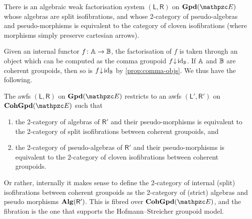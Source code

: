 \documentclass[a4paper,11pt]{amsart}
\newcommand{\cmmcatincat}[2]{#1 \downarrow #2}
\begin{document}
There is an algebraic weak factorisation system $(\mathsf{L},\mathsf{R})$ on $\Egpdin$ whose algebras are split isofibrations, and whose 2-category of pseudo-algebras and pseudo-morphisms is equivalent to the category of cloven isofibrations (where morphisms simply preserve cartesian arrows).

Given an internal functor $f\colon \mathbb{A} \to \mathbb{B}$, the factorisation of $f$ is taken through an object which can be computed as the comma groupoid $\cmmcatincat{f\hspace{-.5ex}}{\hspace{-.3ex}\idcat{\Bgpdf}}$.
If $\mathbb{A}$ and $\mathbb{B}$ are coherent groupoids,
then so is $\cmmcatincat{f\hspace{-.5ex}}{\hspace{-.3ex}\idcat{\Bgpdf}}$ by \cref{prop:comma-objs}.
We thus have the following.

\begin{prop}
	The awfs $(\mathsf{L},\mathsf{R})$ on $\Egpdin$ restricts to an awfs $(\mathsf{L}',\mathsf{R}')$ on $\Echgpdin$ such that
	\begin{enumerate}
		\item
		the 2-category of algebras of $\mathsf{R}'$ and their pseudo-morphisms is equivalent to the 2-category of split isofibrations between coherent groupoids, and
		\item
		the 2-category of pseudo-algebras of $\mathsf{R}'$ and their pseudo-morphisms is equivalent to the 2-category of cloven isofibrations between coherent groupoids.
	\end{enumerate}
\end{prop}

Or rather, internally it makes sense to define the 2-category of internal (split) isofibrations between coherent groupoids as the 2-category of (strict) algebras and pseudo morphisms $\mathbf{Alg}(\mathsf{R'})$.
This is fibred over $\Echgpdin$, and the fibration is the one that supports the Hofmann--Streicher groupoid model.
\end{document}
